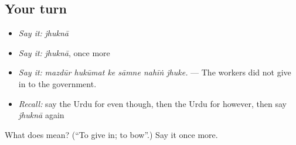 \subsection*{Your turn}
\begin{itemize}
\raggedright
  \item \emph{Say it:} \emph{jhuknā}
  \item \emph{Say it:} \emph{jhuknā}, once more
  \item \emph{Say it:} \emph{mazdūr hukūmat ke sāmne nahīṅ jhuke.} — The workers did not give in to the government.
  \item \emph{Recall:} say the Urdu for even though, then the Urdu for however, then say \emph{jhuknā} again
\end{itemize}

\begin{tcolorbox}[breakable,colback=teal!4,colframe=teal!35!black,title={Before you move on}]
What does  mean? (\textquotedblleft{}To give in; to bow\textquotedblright{}.) Say it once more.
\end{tcolorbox}
